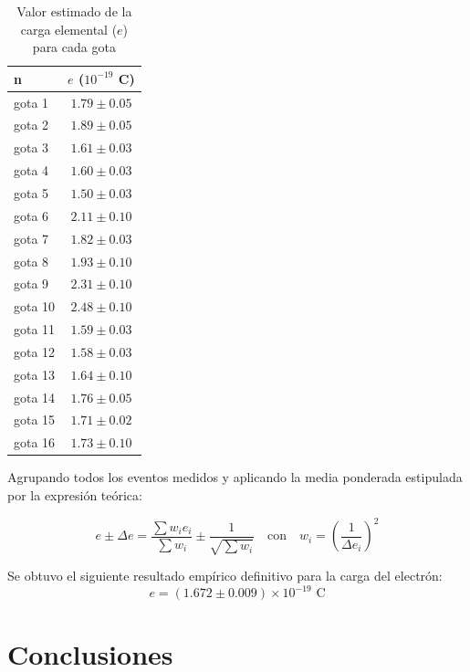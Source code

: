 \documentclass[9pt,a4paper,twocolumn,twoside]{rho-class/rho}
\begin{document}
\begin{table}[hbt!]
\centering
\begin{tabular}{lc}
\hline
n & $e$ ($10^{-19}$ C) \\
\hline
gota 1  & $1.79 \pm 0.05$ \\
gota 2  & $1.89 \pm 0.05$ \\
gota 3  & $1.61 \pm 0.03$ \\
gota 4  & $1.60 \pm 0.03$ \\
gota 5  & $1.50 \pm 0.03$ \\
gota 6  & $2.11 \pm 0.10$ \\
gota 7  & $1.82 \pm 0.03$ \\
gota 8  & $1.93 \pm 0.10$ \\
gota 9  & $2.31 \pm 0.10$ \\
gota 10 & $2.48 \pm 0.10$ \\
gota 11 & $1.59 \pm 0.03$ \\
gota 12 & $1.58 \pm 0.03$ \\
gota 13 & $1.64 \pm 0.10$ \\
gota 14 & $1.76 \pm 0.05$ \\
gota 15 & $1.71 \pm 0.02$ \\
gota 16 & $1.73 \pm 0.10$ \\
\hline
\end{tabular}
\vspace{0.1cm}
\caption{Valor estimado de la carga elemental ($e$) para cada gota}
\label{tab:carga_elemental_gotas}
\end{table}

Agrupando todos los eventos medidos y aplicando la media ponderada estipulada por la expresión teórica:

\begin{equation}
e \pm \Delta e = \frac{\sum w_i e_i}{\sum w_i} \pm \frac{1}{\sqrt{\sum w_i}} \quad \text{con} \quad w_i = \left( \frac{1}{\Delta e_i} \right)^2
\end{equation}

Se obtuvo el siguiente resultado empírico definitivo para la carga del electrón:
\vspace{0.2cm}
\begin{equation*}
\boxed{e = (1.672 \pm 0.009) \times 10^{-19} \text{ C}}
\end{equation*}

\section{Conclusiones}
\end{document}
